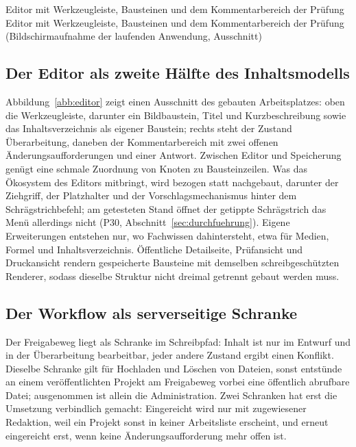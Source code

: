 %
{Editor mit Werkzeugleiste, Bausteinen und dem Kommentarbereich der Prüfung}%
{Editor mit Werkzeugleiste, Bausteinen und dem Kommentarbereich der Prüfung (Bildschirmaufnahme der laufenden Anwendung, Ausschnitt)}

\subsection{Der Editor als zweite Hälfte des Inhaltsmodells}
\label{subsec:editor}

Abbildung~\ref{abb:editor} zeigt einen Ausschnitt des gebauten Arbeitsplatzes: oben die Werkzeugleiste, darunter ein Bildbaustein, Titel und Kurzbeschreibung sowie das Inhaltsverzeichnis als eigener Baustein; rechts steht der Zustand Überarbeitung, daneben der Kommentarbereich mit zwei offenen Änderungsaufforderungen und einer Antwort. Zwischen Editor und Speicherung genügt eine schmale Zuordnung von Knoten zu Bausteinzeilen. Was das Ökosystem des Editors mitbringt, wird bezogen statt nachgebaut, darunter der Ziehgriff, der Platzhalter und der Vorschlagsmechanismus hinter dem Schrägstrichbefehl; am getesteten Stand öffnet der getippte Schrägstrich das Menü allerdings nicht (P30, Abschnitt~\ref{sec:durchfuehrung}). Eigene Erweiterungen entstehen nur, wo Fachwissen dahintersteht, etwa für Medien, Formel und Inhaltsverzeichnis. Öffentliche Detailseite, Prüfansicht und Druckansicht rendern gespeicherte Bausteine mit demselben schreibgeschützten Renderer, sodass dieselbe Struktur nicht dreimal getrennt gebaut werden muss.

\subsection{Der Workflow als serverseitige Schranke}
\label{subsec:workflow-schranke}

Der Freigabeweg liegt als Schranke im Schreibpfad: Inhalt ist nur im Entwurf und in der Überarbeitung bearbeitbar, jeder andere Zustand ergibt einen Konflikt. Dieselbe Schranke gilt für Hochladen und Löschen von Dateien, sonst entstünde an einem veröffentlichten Projekt am Freigabeweg vorbei eine öffentlich abrufbare Datei; ausgenommen ist allein die Administration. Zwei Schranken hat erst die Umsetzung verbindlich gemacht: Eingereicht wird nur mit zugewiesener Redaktion, weil ein Projekt sonst in keiner Arbeitsliste erscheint, und erneut eingereicht erst, wenn keine Änderungsaufforderung mehr offen ist.


